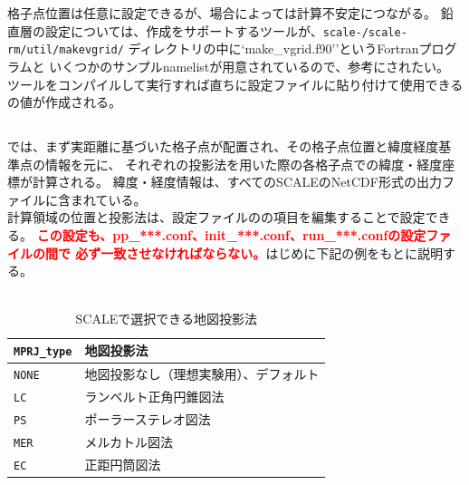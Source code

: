 格子点位置は任意に設定できるが、場合によっては計算不安定につながる。
鉛直層の設定については、作成をサポートするツールが、\texttt{scale-\version/scale-rm/util/makevgrid/}
ディレクトリの中に`make\_vgrid.f90''というFortranプログラムと
いくつかのサンプルnamelistが用意されているので、参考にされたい。
ツールをコンパイルして実行すれば直ちに設定ファイルに貼り付けて使用できる
の値が作成される。

\subsection{\SecAdvanceMapprojectionSetting} \label{subsec:adv_mapproj}
\scalerm では、まず実距離に基づいた格子点が配置され、その格子点位置と緯度経度基準点の情報を元に、
それぞれの投影法を用いた際の各格子点での緯度・経度座標が計算される。
緯度・経度情報は、すべてのSCALEのNetCDF形式の出力ファイルに含まれている。\\
計算領域の位置と投影法は、設定ファイルのの項目を編集することで設定できる。
\textcolor{red}{\bf この設定も、pp\_***.conf、init\_***.conf、run\_***.confの設定ファイルの間で
必ず一致させなければならない。}はじめに下記の例をもとに説明する。\\

\\

\begin{table}[b]
\begin{center}
\caption{SCALEで選択できる地図投影法}
\begin{tabularx}{150mm}{|l|X|} \hline
 \rowcolor[gray]{0.9} \verb|MPRJ_type| & 地図投影法 \\ \hline
 \verb|NONE| & 地図投影なし（理想実験用）、デフォルト \\ \hline
 \verb|LC|   & ランベルト正角円錐図法              \\ \hline
 \verb|PS|   & ポーラーステレオ図法                \\ \hline
 \verb|MER|  & メルカトル図法                     \\ \hline
 \verb|EC|   & 正距円筒図法                       \\ \hline
\end{tabularx}
\label{tab:map_proj}
\end{center}
\end{table}

